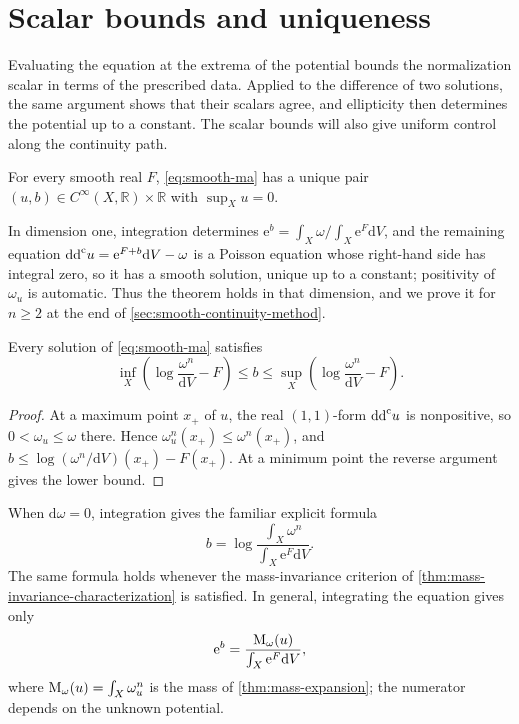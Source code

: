 \section{Scalar bounds and uniqueness}

Evaluating the equation at the extrema of the potential bounds the normalization scalar in terms of the prescribed data. Applied to the difference of two solutions, the same argument shows that their scalars agree, and ellipticity then determines the potential up to a constant. The scalar bounds will also give uniform control along the continuity path.

\begin{theorem}\label{thm:tw-smooth}
For every smooth real $F$, \eqref{eq:smooth-ma} has a unique pair $(u,b)\in C^\infty(X,\mathbb R)\times\mathbb R$ with $\sup_Xu=0$.
\end{theorem}

In dimension one, integration determines
$\mathrm{e}^b=\int_X\omega/\int_X\mathrm{e}^F \mathrm{d}V$, and the remaining equation $\mathrm{dd}^{\mathrm{c}} u=\mathrm{e}^{F+b}\mathrm{d}V-\omega$ is a Poisson equation whose right-hand side has integral zero, so it has a smooth solution, unique up to a constant; positivity of $\omega_u$ is automatic. Thus the theorem holds in that dimension, and we prove it for $n\geq2$ at the end of \cref{sec:smooth-continuity-method}.

\begin{proposition}\label{prop:b-extrema}
Every solution of \eqref{eq:smooth-ma} satisfies
\[
 \inf_X\!\left(\log\frac{\omega^n}{\mathrm{d}V}-F\right)
 \leq b\leq
 \sup_X\!\left(\log\frac{\omega^n}{\mathrm{d}V}-F\right).
\]
\end{proposition}
\begin{proof}
At a maximum point $x_+$ of $u$, the real $(1,1)$-form $\mathrm{dd}^{\mathrm{c}} u$ is nonpositive, so $0<\omega_u\leq\omega$ there. Hence $\omega_u^n(x_+)\leq\omega^n(x_+)$, and
$b\leq\log(\omega^n/\mathrm{d}V)(x_+)-F(x_+)$.
At a minimum point the reverse argument gives the lower bound.
\end{proof}

When $\mathrm{d}\omega=0$, integration gives the familiar explicit formula
\begin{equation}\label{eq:closed-b}
 b=\log\frac{\int_X\omega^n}{\int_X\mathrm{e}^F \mathrm{d}V}.
\end{equation}
The same formula holds whenever the mass-invariance criterion of \cref{thm:mass-invariance-characterization} is satisfied. In general, integrating the equation gives only
\[
 \mathrm{e}^b=\frac{\mathrm M_\omega(u)}{\int_X\mathrm{e}^F \mathrm{d}V},
\]
where $\mathrm M_\omega(u)=\int_X\omega_u^n$ is the mass of \cref{thm:mass-expansion}; the numerator depends on the unknown potential.

